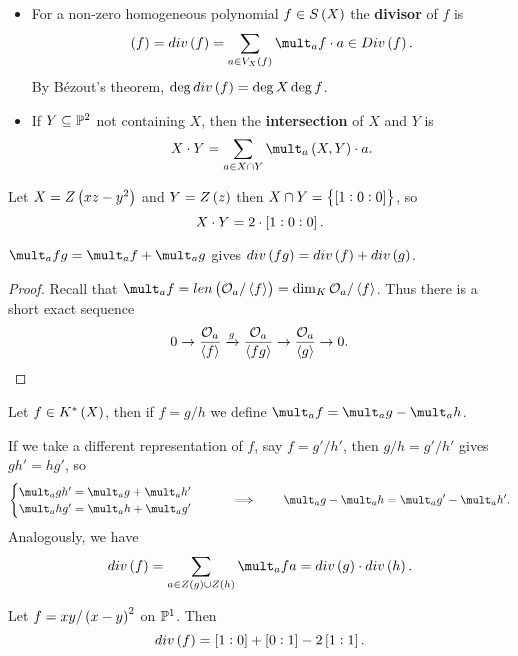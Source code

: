 \pagebreak

\begin{definition}
\hfill
\begin{itemize}
\item For a non-zero homogeneous polynomial $ f \in S\br{X} $ the \textbf{divisor} of $ f $ is
$$ \br{f} = div\br{f} = \sum_{a \in V_X\br{f}} \mult_a f \cdot a \in Div\br{f}. $$
By B\'ezout's theorem, $ \deg div\br{f} = \deg X\deg f $.
\item If $ Y \subseteq \mathbb{P}^2 $ not containing $ X $, then the \textbf{intersection} of $ X $ and $ Y $ is
$$ X \cdot Y = \sum_{a \in X \cap Y} \mult_a \br{X, Y} \cdot a. $$
\end{itemize}
\end{definition}

\begin{example}
Let $ X = Z\br{xz - y^2} $ and $ Y = Z\br{z} $ then $ X \cap Y = \cbr{\sbr{1 : 0 : 0}} $, so
$$ X \cdot Y = 2 \cdot \sbr{1 : 0 : 0}. $$
\end{example}

\begin{lemma}
$ \mult_a fg = \mult_a f + \mult_a g $ gives $ div\br{fg} = div\br{f} + div\br{g} $.
\end{lemma}

\begin{proof}
Recall that $ \mult_a f = len\br{\OOO_a / \abr{f}} = \dim_K \OOO_a / \abr{f} $. Thus there is a short exact sequence
$$ 0 \to \dfrac{\mathcal{O}_a}{\left\langle f \right\rangle} \xrightarrow{g} \dfrac{\mathcal{O}_a}{\left\langle fg \right\rangle} \to \dfrac{\mathcal{O}_a}{\left\langle g \right\rangle} \to 0. $$
\end{proof}

\begin{definition}
Let $ f \in K^*\br{X} $, then if $ f = g / h $ we define $ \mult_a f = \mult_a g - \mult_a h $.
\end{definition}

If we take a different representation of $ f $, say $ f = g' / h' $, then $ g / h = g' / h' $ gives $ gh' = hg' $, so
$$
\begin{cases}
\mult_a gh' = \mult_a g + \mult_a h' \\
\mult_a hg' = \mult_a h + \mult_a g'
\end{cases}
\qquad \implies \qquad \mult_a g - \mult_a h = \mult_a g' - \mult_a h'. $$
Analogously, we have
$$ div\br{f} = \sum_{a \in Z\br{g} \cup Z\br{h}} \mult_a fa = div\br{g} \cdot div\br{h}. $$

\begin{example}
Let $ f = xy / \br{x - y}^2 $ on $ \mathbb{P}^1 $. Then
$$ div\br{f} = \sbr{1 : 0} + \sbr{0 : 1} - 2\sbr{1 : 1}. $$
\end{example}

